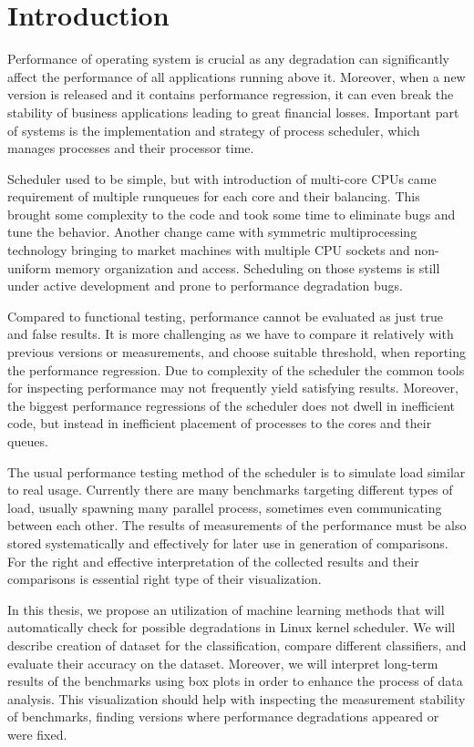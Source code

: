 \chapter{Introduction}
Performance of operating system is crucial as any degradation can significantly
affect the performance of all applications running above it. Moreover, when a
new version is released and it contains performance regression, it can even
break the stability of business applications leading to great financial losses.
Important part of systems is the implementation and strategy of process
scheduler, which manages processes and their processor time.

Scheduler used to be simple, but with introduction of multi-core CPUs came
requirement of multiple runqueues for each core and their balancing. This brought
some complexity to the code and took some time to eliminate bugs and tune the
behavior. Another change came with symmetric multiprocessing technology bringing
to market machines with multiple CPU sockets and non-uniform memory organization
and access. Scheduling on those systems is still under active development and
prone to performance degradation bugs.

Compared to functional testing, performance cannot be evaluated as just true and
false results. It is more challenging as we have to compare it relatively with
previous versions or measurements, and choose suitable threshold, when reporting
the performance regression. Due to complexity of the scheduler the common tools
for inspecting performance may not frequently yield satisfying results.
Moreover, the biggest performance regressions of the scheduler does not dwell in
inefficient code, but instead in inefficient placement of processes to the cores
and their queues.

The usual performance testing method of the scheduler is to simulate load
similar to real usage. Currently there are many benchmarks targeting different
types of load, usually spawning many parallel process, sometimes even
communicating between each other. The results of measurements of the performance
must be also stored systematically and effectively for later use in generation
of comparisons. For the right and effective interpretation of the collected
results and their comparisons is essential right type of their visualization.

In this thesis, we propose an utilization of machine learning methods that will
automatically check for possible degradations in Linux kernel scheduler. We will
describe creation of dataset for the classification, compare different
classifiers, and evaluate their accuracy on the dataset.
Moreover, we will interpret long-term results of the benchmarks using box plots
in order to enhance the process of data analysis. This visualization should help
with inspecting the measurement stability of benchmarks, finding versions where
performance degradations appeared or were fixed.

